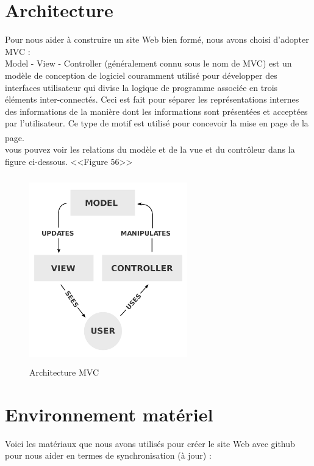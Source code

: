 \documentclass[12pt]{report}
\begin{document}
\section{Architecture}

Pour nous aider à construire un site Web bien formé, nous avons choisi d'adopter MVC :
\\
Model - View - Controller (généralement connu sous le nom de MVC) est un modèle de conception de logiciel couramment utilisé pour développer des interfaces utilisateur qui divise la logique de programme associée en trois éléments inter-connectés. Ceci est fait pour séparer les représentations internes des informations de la manière dont les informations sont présentées et acceptées par l'utilisateur. Ce type de motif est utilisé pour concevoir la mise en page de la page.\textsuperscript{\cite{supaartagorn2011php}}
\\
vous pouvez voir les relations du modèle et de la vue et du contrôleur dans la figure ci-dessous. <<Figure 56>>

\newpage

\begin{figure}[h]
\centering
    \includegraphics[width = 2.7in, height = 3.2in]{../Images/MVC.png}
\caption{Architecture MVC}
\end{figure}

\section{Environnement matériel}

Voici les matériaux que nous avons utilisés pour créer le site Web avec github pour nous aider en termes de synchronisation (à jour) :

\vspace{0.4in}
\end{document}
